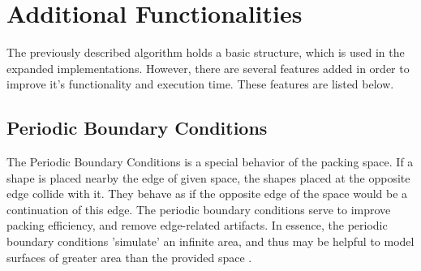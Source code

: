\documentclass[12pt, oneside]{report}
\begin{document}
\section {Additional Functionalities}

The previously described algorithm holds a basic structure, which is used in the expanded implementations. However, there are several features added in order to improve it's functionality and execution time. These features are listed below.

\subsection{Periodic Boundary Conditions}

The Periodic Boundary Conditions is a special behavior of the packing space. If a shape is placed nearby the edge of given space, the shapes placed at the opposite edge collide with it. They behave as if the opposite edge of the space would be a continuation of this edge. The periodic boundary conditions serve to improve packing efficiency, and remove edge-related artifacts. In essence, the periodic boundary conditions 'simulate' an infinite area, and thus may be helpful to model surfaces of greater area than the provided space \cite{ciesla_mziff}.
\end{document}

